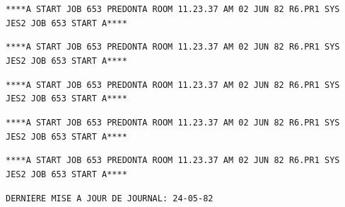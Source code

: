 \texttt{****A START JOB 653 PREDONTA ROOM 11.23.37 AM 02 JUN 82 R6.PR1 SYS JES2 JOB 653 START A****}

\texttt{****A START JOB 653 PREDONTA ROOM 11.23.37 AM 02 JUN 82 R6.PR1 SYS JES2 JOB 653 START A****}

\texttt{****A START JOB 653 PREDONTA ROOM 11.23.37 AM 02 JUN 82 R6.PR1 SYS JES2 JOB 653 START A****}

\texttt{****A START JOB 653 PREDONTA ROOM 11.23.37 AM 02 JUN 82 R6.PR1 SYS JES2 JOB 653 START A****}

\texttt{****A START JOB 653 PREDONTA ROOM 11.23.37 AM 02 JUN 82 R6.PR1 SYS JES2 JOB 653 START A****}

\texttt{DERNIERE MISE A JOUR DE JOURNAL: 24-05-82}
